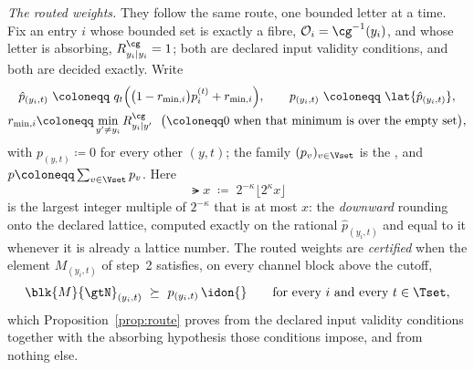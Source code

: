\begin{definition}
\emph{The routed weights.} They follow the same route, one bounded letter at a
time. Fix an entry $i$ whose bounded set is exactly a fibre,
$\mathcal{O}_i=\cg^{-1}(y_i)$, and whose letter is absorbing,
$R^{\cg}_{y_i|y_i}=1$; both are declared input validity conditions, and both
are decided exactly. Write
\begin{equation}\label{eq:weightroute}
\begin{gathered}
  \hat p_{(y_i,t)}\ \coloneqq\
  q_t\Big(\big(1-r_{\min,i}\big)p^{(t)}_i+r_{\min,i}\Big),
  \qquad
  p_{(y_i,t)}\ \coloneqq\ \lat{\hat p_{(y_i,t)}},\\
  r_{\min,i}\coloneqq\min_{y'\ne y_i}R^{\cg}_{y_i|y'}
  \ \ \big(\coloneqq0\ \text{when that minimum is over the empty set}\big),
\end{gathered}
\end{equation}
with $p_{(y,t)}\coloneqq0$ for every other $(y,t)$; the family
$(p_v)_{v\in\Vset}$ is the
,
and $p\coloneqq\sum_{v\in\Vset}p_v$. Here
\begin{equation}\label{eq:latdown}
  \lat{x}\;\coloneqq\;2^{-\kappa}\big\lfloor2^{\kappa}x\big\rfloor
\end{equation}
is the largest integer multiple of $2^{-\kappa}$ that is at most $x$: the
\emph{downward} rounding onto the declared lattice, computed exactly on the
rational $\hat p_{(y_i,t)}$ and equal to it whenever it is already a lattice
number. The routed weights are \emph{certified} when the element
$M_{(y_i,t)}$ of step~2 satisfies, on every channel block above the cutoff,
\begin{equation}\label{eq:certroute}
  \blk{M}{\gtN}_{(y_i,t)}\ \succeq\ p_{(y_i,t)}\,\idon{}
  \qquad\text{for every }i\text{ and every }t\in\Tset ,
\end{equation}
which Proposition~\ref{prop:route} proves from the declared input validity
conditions together with the absorbing hypothesis those conditions impose,
and from nothing else.


\end{definition}

